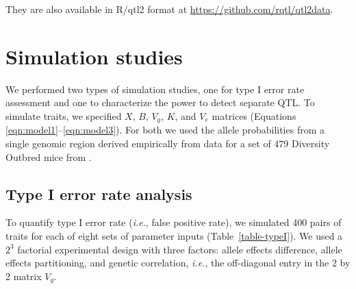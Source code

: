 \documentclass[oneside]{book}\usepackage[]{graphicx}\usepackage[]{color}
\begin{document}
\noindent They are also available in R/qtl2 format at
\href{https://github.com/rqtl/qtl2data}{https://github.com/rqtl/qtl2data}.




\section{Simulation studies}

We performed two types of simulation studies, one for type I error
rate assessment and one to characterize the power to detect separate
QTL. To simulate traits, we specified $X$, $B$, $V_g$, $K$, and $V_e$
matrices (Equations \ref{eqn:model1}--\ref{eqn:model3}). For both we
used the allele probabilities from a single genomic region derived
empirically from data for a set of 479 Diversity Outbred mice from
\citet{keller2018genetic}.

\subsection{Type I error rate analysis}

To quantify type I error rate ({\em i.e.}, false positive rate), we
simulated 400 pairs of traits for each of eight sets of parameter
inputs (Table~\ref{table-typeI}). We used a $2^3$ factorial
experimental design with three factors: allele effects difference,
allele effects partitioning, and genetic correlation, \textit{i.e.},
the off-diagonal entry in the 2 by 2 matrix $V_g$.
\end{document}
